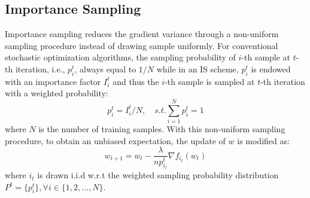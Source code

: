 \documentclass[twoside,leqno,twocolumn]{article}
\begin{document}
\subsection{Importance Sampling}
Importance sampling reduces the gradient variance through a non-uniform sampling procedure instead of drawing sample uniformly. For conventional stochastic optimization algorithms, the sampling probability of $i$-th sample at $t$-th iteration, i.e., $p_i^t$, always equal to $1/N$ while in an IS scheme, $p_i^t$ is endowed with an importance factor $I_i^t$ and thus the $i$-th sample is sampled at $t$-th iteration with a weighted probability:
\begin{equation}
p^{t}_i=I^t_i/N, \quad s.t. \sum_{i=1}^{N}p_i^t=1
\end{equation}
where $N$ is the number of training samples. With this non-uniform sampling procedure, to obtain an unbiased expectation, the update of $w$ is modified as:
\begin{equation}
\label{up}
w_{t+1} = w_t-\frac{\lambda}{np^t_{i_t}}\nabla f_{i_t}(w_t)
\end{equation}
where $i_t$ is drawn i.i.d w.r.t the weighted sampling probability distribution $P^t=\{p_i^t\}, \forall i\in \{1,2,...,N\}$.
\end{document}
